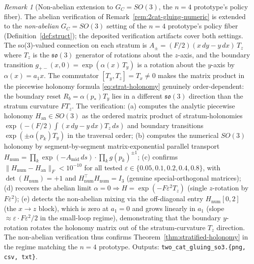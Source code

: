 \documentclass[11pt,a4paper]{article}
\theoremstyle{plain}
\theoremstyle{definition}
\theoremstyle{remark}
\newtheorem{remark}[theorem]{Remark}
\newcommand{\so}{\mathfrak{so}}
\begin{document}
\begin{remark}[Non-abelian extension to $G_C = SO(3)$, the $n=4$
prototype's policy fiber]
\label{rem:2cat-gluing-so3}
The abelian verification of Remark~\ref{rem:2cat-gluing-numeric} is
extended to the \emph{non-abelian} $G_C = SO(3)$ setting of the $n=4$
prototype's policy fiber (Definition~\ref{def:struct}); the deposited verification
artifacts cover both settings. The
so(3)-valued connection on each stratum is $A_\pm = (F/2)(x\,dy - y\,dx)
\,T_z$ where $T_z$ is the $\so(3)$ generator of rotations about the
$z$-axis, and the boundary transition
$g_{+-}(x, 0) = \exp(\alpha(x) \, T_y)$ is a rotation about the
$y$-axis by $\alpha(x) = a_1 x$. The commutator $[T_y, T_z] = T_x \neq
0$ makes the matrix product in the piecewise holonomy formula
\eqref{eq:strat-holonomy} genuinely order-dependent: the boundary reset
$R_b = \alpha(p_*) T_y$ lies in a different $\so(3)$ direction than the
stratum curvature $F T_z$. The verification: (a) computes the analytic
piecewise holonomy $H_{\mathrm{an}} \in SO(3)$ as the ordered matrix
product of stratum-holonomies $\exp(-(F/2) \int (x\,dy - y\,dx) T_z\,ds)$
and boundary transitions $\exp(\pm \alpha(p_k) T_y)$ in the traversal
order; (b) computes the numerical $SO(3)$ holonomy by segment-by-segment
matrix-exponential parallel transport
$H_{\mathrm{num}} = \prod_k \exp(-A_{\mathrm{mid}}\,ds) \cdot \prod_k
g(p_k)^{\pm 1}$; (c) confirms
$\|H_{\mathrm{num}} - H_{\mathrm{an}}\|_F < 10^{-10}$ for all tested
$\varepsilon \in \{0.05, 0.1, 0.2, 0.4, 0.8\}$, with
$\det(H_{\mathrm{num}}) = +1$ and $H_{\mathrm{num}}^\top H_{\mathrm{num}}
= I_3$ (genuine special-orthogonal matrices); (d) recovers the abelian
limit $\alpha = 0 \Rightarrow H = \exp(-F \varepsilon^2 T_z)$ (single
$z$-rotation by $F \varepsilon^2$); (e) detects the non-abelian
mixing via the off-diagonal entry $H_{\mathrm{num}}[0, 2]$ (the
$x \to z$ block), which is zero at $a_1 = 0$ and grows linearly in
$a_1$ (slope $\approx \varepsilon \cdot F \varepsilon^2 / 2$ in the
small-loop regime), demonstrating that the boundary $y$-rotation
rotates the holonomy matrix out of the stratum-curvature $T_z$ direction.
The non-abelian verification thus confirms Theorem~\ref{thm:stratified-holonomy}
in the regime matching the $n=4$ prototype. Outputs:
\texttt{two\_cat\_gluing\_so3.\{png, csv, txt\}}.
\end{remark}
\end{document}
